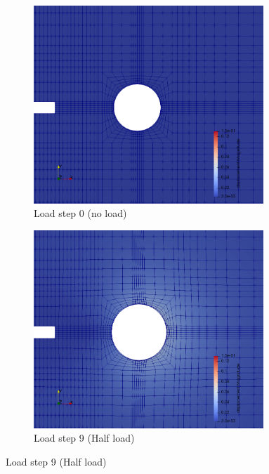 \documentclass[11pt,a4paper,final]{article}
\begin{document}
\begin{figure}[h]
\centering 
\begin{subfigure}[b]{0.32\textwidth}
\centering
\includegraphics[width=0.95\textwidth]{free_space_disp_0.png}
\caption{Load step 0 (no load)}
\label{fig:1.10.1}
\end{subfigure}
\begin{subfigure}[b]{0.32\textwidth}
\centering
\includegraphics[width=0.95\textwidth]{free_space_disp_9.png}
\caption{Load step 9 (Half load)}
\label{fig:1.10.2}
\end{subfigure}

\end{figure}
\end{document}
